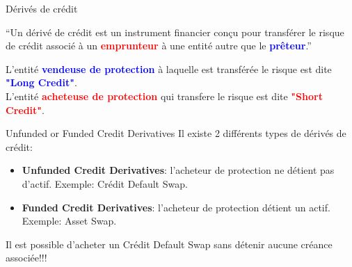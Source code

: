 \documentclass{beamer}
\begin{document}
\begin{frame}{Dérivés de crédit}
\begin{exampleblock}{}
  {\large ``Un dérivé de crédit est un instrument financier conçu pour transférer le risque de crédit associé à un \textcolor{red}{\textbf{emprunteur}} à une entité autre que le \textcolor{blue}{\textbf{prêteur}}.''}
\end{exampleblock}
\vspace{0.5cm}
L'entité \textcolor{blue}{\textbf{vendeuse de protection}} à laquelle est transférée le risque est dite \textcolor{blue}{\textbf{"Long Credit"}}.\\
\vspace{0.5cm}
L'entité \textcolor{red}{\textbf{acheteuse de protection}} qui transfere le risque est dite \textcolor{red}{\textbf{"Short Credit"}}.\\
\end{frame}

\begin{frame}{Unfunded or Funded Credit Derivatives}
Il existe 2 différents types de dérivés de crédit:
\vspace{0.5cm}
\begin{itemize}
\item {}\textbf{Unfunded Credit Derivatives}: l'acheteur  de protection ne détient pas d'actif. Exemple: Crédit Default Swap.
\item {}\textbf{Funded Credit Derivatives}: l'acheteur de protection détient un actif. Exemple: Asset Swap.
\end{itemize}
\vspace{0.5cm}
Il est possible d'acheter un Crédit Default Swap sans détenir aucune créance associée!!!
\end{frame}
\end{document}
